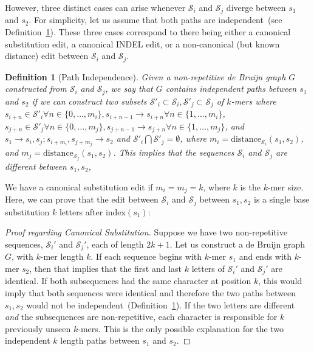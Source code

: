 \documentclass[phd]{ucbthesis}
\newtheorem{defn}{Definition}
\begin{document}
However, three distinct cases can arise whenever $\mathcal{S}_i$ and $\mathcal{S}_j$ diverge between
$s_1$ and $s_2$. For simplicity, let us assume that both paths are independent~(see
Definition~\ref{defn:path-independence}). These three cases correspond to there being either a canonical
substitution edit, a canonical INDEL edit, or a non-canonical (but known distance) edit between
$\mathcal{S}_i$ and $\mathcal{S}_j$.

\begin{defn}[Path Independence]
\label{defn:path-independence}
Given a non-repetitive de Bruijn graph $G$ constructed from $\mathcal{S}_i$ and $\mathcal{S}_j$, we say
that $G$ contains independent paths between $s_1$ and $s_2$ if we can construct two subsets
$\mathcal{S}'_i \subset \mathcal{S}_i, \mathcal{S}'_j \subset \mathcal{S}_j$ of $k$-mers where $s_{i + n}
\in \mathcal{S}'_i \forall n \in \{0, \dots, m_i\}, s_{i + n - 1} \rightarrow s_{i + n} \forall n \in \{1, \dots, m_i\}$,
$s_{j + n} \in \mathcal{S}'_j \forall n \in \{0, \dots, m_j\}, s_{j + n - 1} \rightarrow s_{j + n} \forall n \in \{1,
\dots, m_j\}$, and $s_1 \rightarrow s_i, s_j; s_{i + m_i}, s_{j + m_j} \rightarrow s_2$ and $\mathcal{S}'_i
\bigcap \mathcal{S}'_j = \emptyset$, where $m_i = \text{distance}_{\mathcal{S}_i}(s_1, s_2)$, and $m_j =
\text{distance}_{\mathcal{S}_j}(s_1, s_2)$. This implies that the sequences $\mathcal{S}_i$ and
$\mathcal{S}_j$ are different between $s_1, s_2$,
\end{defn}

We have a canonical substitution edit if $m_i = m_j = k$, where $k$ is the $k$-mer size. Here, we can
prove that the edit between $\mathcal{S}_i$ and $\mathcal{S}_j$ between $s_1, s_2$ is a single base
substitution $k$ letters after $\text{index}(s_1)$:

\begin{proof}[Proof regarding Canonical Substitution]
\label{proof:canonical-substitution}
Suppose we have two non-repetitive sequences, $\mathcal{S}_i'$ and $\mathcal{S}_j'$, each of length
$2k + 1$. Let us construct a de Bruijn graph $G$, with $k$-mer length $k$. If each sequence begins with
$k$-mer $s_1$ and ends with $k$-mer $s_2$, then that implies that the first and last $k$ letters of
$\mathcal{S}_i'$ and $\mathcal{S}_j'$ are identical. If both subsequences had the same character at
position $k$, this would imply that both sequences were identical and therefore the two paths between
$s_1, s_2$ would not be independent~(Definition~\ref{defn:path-independence}). If the two letters are
different \emph{and} the subsequences are non-repetitive, each character is responsible for $k$
previously unseen $k$-mers. This is the only possible explanation for the two independent $k$ length
paths between $s_1$ and $s_2$.
\end{proof}
\end{document}
